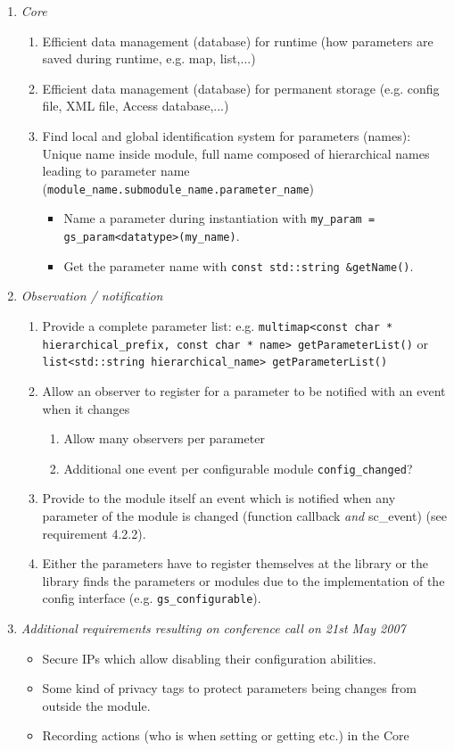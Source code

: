 \begin{enumerate}
	\item {\em Core} 
	\begin{enumerate}
		\item Efficient data management (database) for runtime (how parameters are saved during runtime, e.g. map, list,...) 
		\item Efficient data management (database) for permanent storage (e.g. config file, XML file, Access database,...) 
		\item Find local and global identification system for parameters (names): Unique name inside module, full name composed of hierarchical names leading to parameter name (\lstinline|module_name.submodule_name.parameter_name|) 
		\begin{itemize}
			\item Name a parameter during instantiation with \lstinline|my_param = gs_param<datatype>(my_name)|. 
			\item Get the parameter name with \lstinline|const std::string &getName()|. 
		\end{itemize}
	\end{enumerate}

	\item {\em Observation / notification} 
	\begin{enumerate}
		\item Provide a complete parameter list: e.g. \lstinline|multimap<const char * hierarchical_prefix, const char * name> getParameterList()| or \lstinline|list<std::string hierarchical_name> getParameterList()| 
		\item Allow an observer to register for a parameter to be notified with an event when it changes 
		\begin{enumerate}
			\item Allow many observers per parameter 
			\item Additional one event per configurable module \lstinline|config_changed|? 
		\end{enumerate}
		\item Provide to the module itself an event which is notified when any parameter of the module is changed (function callback {\em and} sc\_event) (see requirement 4.2.2). 
		\item Either the parameters have to register themselves at the library or the library finds the parameters or modules due to the implementation of the config interface (e.g. \lstinline|gs_configurable|). 
	\end{enumerate}

	\item {\em Additional requirements resulting on conference call on 21st May 2007} 
	\begin{itemize}
		\item Secure IPs which allow disabling their configuration abilities. 
		\item Some kind of privacy tags to protect parameters being changes from outside the module. 
		\item Recording actions (who is when setting or getting etc.) in the Core 
	\end{itemize}

\end{enumerate}


